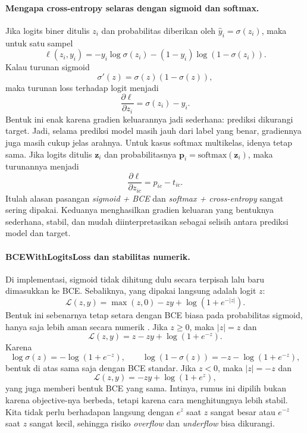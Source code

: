 \documentclass{article}
\begin{document}
\paragraph{Mengapa cross-entropy selaras dengan sigmoid dan softmax.}
Jika logits biner ditulis $z_i$ dan probabilitas diberikan oleh $\hat{y}_i=\sigma(z_i)$, maka untuk satu sampel
\begin{equation}
\ell(z_i,y_i)= -y_i\log \sigma(z_i) - (1-y_i)\log(1-\sigma(z_i)).
\end{equation}
Kalau turunan sigmoid
\begin{equation}
\sigma'(z)=\sigma(z)(1-\sigma(z)),
\end{equation}
maka turunan loss terhadap logit menjadi
\begin{equation}
\frac{\partial \ell}{\partial z_i}=\sigma(z_i)-y_i.
\end{equation}
Bentuk ini enak karena gradien keluarannya jadi sederhana: prediksi dikurangi target. Jadi, selama prediksi model masih jauh dari label yang benar, gradiennya juga masih cukup jelas arahnya. Untuk kasus softmax multikelas, idenya tetap sama. Jika logits ditulis $\mathbf{z}_i$ dan probabilitasnya $\mathbf{p}_i=\mathrm{softmax}(\mathbf{z}_i)$, maka turunannya menjadi
\begin{equation}
\frac{\partial \ell}{\partial z_{ic}} = p_{ic}-t_{ic}.
\end{equation}
Itulah alasan pasangan \textit{sigmoid + BCE} dan \textit{softmax + cross-entropy} sangat sering dipakai. Keduanya menghasilkan gradien keluaran yang bentuknya sederhana, stabil, dan mudah diinterpretasikan sebagai selisih antara prediksi model dan target.

\paragraph{BCEWithLogitsLoss dan stabilitas numerik.}
Di implementasi, sigmoid tidak dihitung dulu secara terpisah lalu baru dimasukkan ke BCE. Sebaliknya, yang dipakai langsung adalah logit $z$:
\begin{equation}
\mathcal{L}(z,y)=\max(z,0) - zy + \log\left(1+e^{-|z|}\right).
\end{equation}
Bentuk ini sebenarnya tetap setara dengan BCE biasa pada probabilitas sigmoid, hanya saja lebih aman secara numerik \citep{pytorch_bcewithlogitsloss}. Jika $z\ge 0$, maka $|z|=z$ dan
\begin{equation}
\mathcal{L}(z,y)= z-zy+\log(1+e^{-z}).
\end{equation}
Karena
\begin{equation}
\log \sigma(z)= -\log(1+e^{-z}),\qquad
\log(1-\sigma(z))= -z-\log(1+e^{-z}),
\end{equation}
bentuk di atas sama saja dengan BCE standar. Jika $z<0$, maka $|z|=-z$ dan
\begin{equation}
\mathcal{L}(z,y)= -zy+\log(1+e^{z}),
\end{equation}
yang juga memberi bentuk BCE yang sama. Intinya, rumus ini dipilih bukan karena objective-nya berbeda, tetapi karena cara menghitungnya lebih stabil. Kita tidak perlu berhadapan langsung dengan $e^{z}$ saat $z$ sangat besar atau $e^{-z}$ saat $z$ sangat kecil, sehingga risiko \textit{overflow} dan \textit{underflow} bisa dikurangi.
\end{document}
